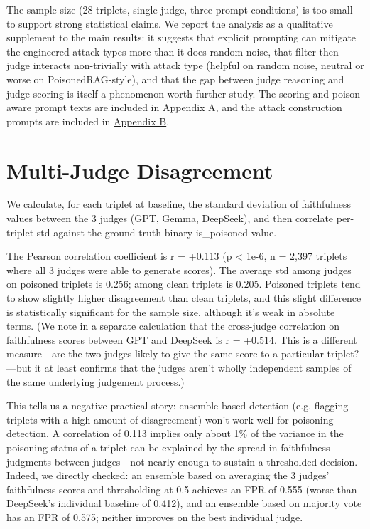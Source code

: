 The sample size (28 triplets, single judge, three prompt conditions) is too small to support strong statistical claims. We report the analysis as a qualitative supplement to the main results: it suggests that explicit prompting can mitigate the engineered attack types more than it does random noise, that filter-then-judge interacts non-trivially with attack type (helpful on random noise, neutral or worse on PoisonedRAG-style), and that the gap between judge reasoning and judge scoring is itself a phenomenon worth further study. The scoring and poison-aware prompt texts are included in \hyperref[app:evaluation-prompts]{Appendix A}, and the attack construction prompts are included in \hyperref[app:attack-prompts]{Appendix B}.

\section{Multi-Judge Disagreement}

We calculate, for each triplet at baseline, the standard deviation of faithfulness values between the 3 judges (GPT, Gemma, DeepSeek), and then correlate per-triplet std against the ground truth binary is\_poisoned value.

The Pearson correlation coefficient is r = +0.113 (p < 1e-6, n = 2,397 triplets where all 3 judges were able to generate scores). The average std among judges on poisoned triplets is 0.256; among clean triplets is 0.205. Poisoned triplets tend to show slightly higher disagreement than clean triplets, and this slight difference is statistically significant for the sample size, although it's weak in absolute terms. (We note in a separate calculation that the cross-judge correlation on faithfulness scores between GPT and DeepSeek is r = +0.514. This is a different measure---are the two judges likely to give the same score to a particular triplet?---but it at least confirms that the judges aren't wholly independent samples of the same underlying judgement process.)

This tells us a negative practical story: ensemble-based detection (e.g. flagging triplets with a high amount of disagreement) won't work well for poisoning detection. A correlation of 0.113 implies only about 1\% of the variance in the poisoning status of a triplet can be explained by the spread in faithfulness judgments between judges---not nearly enough to sustain a thresholded decision. Indeed, we directly checked: an ensemble based on averaging the 3 judges' faithfulness scores and thresholding at 0.5 achieves an FPR of 0.555 (worse than DeepSeek's individual baseline of 0.412), and an ensemble based on majority vote has an FPR of 0.575; neither improves on the best individual judge.

